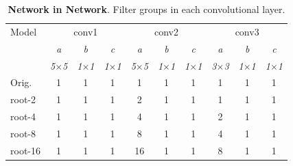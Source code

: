 \documentclass[thesis]{subfiles}
\begin{document}
	\begin{table}[tbp]
		\caption[Network in network root architectures.]{\textbf{Network in Network}. Filter groups in each convolutional layer.}
		\label{table:ninconfig}
		\centering
		\begin{tabular}{@{}lccccccccc@{}}
			\toprule
			Model & \multicolumn{3}{c}{conv1} & \multicolumn{3}{c}{conv2} & \multicolumn{3}{c}{conv3} \\
			& \textit{\footnotesize a} & \textit{\footnotesize b} & \textit{\footnotesize c} & \textit{\footnotesize a} & \textit{\footnotesize b} & \textit{\footnotesize c} & \textit{\footnotesize a} & \textit{\footnotesize b} & \textit{\footnotesize c} \\
			& \textit{\footnotesize5$\times$5} & \textit{\footnotesize1$\times$1} & \textit{\footnotesize1$\times$1} & \textit{\footnotesize5$\times$5} & \textit{\footnotesize1$\times$1} & \textit{\footnotesize1$\times$1} & \textit{\footnotesize3$\times$3} & \textit{\footnotesize1$\times$1} & \textit{\footnotesize1$\times$1} \\
			Orig. & 1 & 1 & 1 & 1 & 1 & 1 & 1 & 1 & 1\\
			\midrule
			root-2 & 1 & 1 & 1 & 2 & 1 & 1 & 1 & 1 & 1\\
			root-4 & 1 & 1 & 1 & 4 & 1 & 1 & 2 & 1 & 1\\
			root-8 & 1 & 1 & 1 & 8 & 1 & 1 & 4 & 1 & 1\\
			root-16 & 1 & 1 & 1 & 16 & 1 & 1 & 8 & 1 & 1\\
			\bottomrule
		\end{tabular}
	\end{table}
\end{document}
